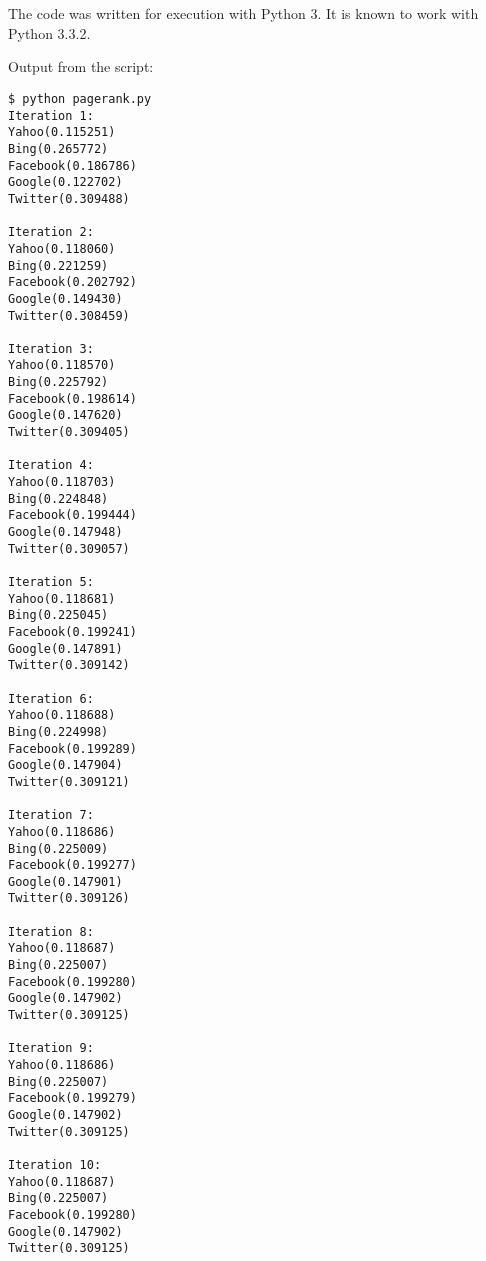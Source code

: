 
\section{} \label{appendix:3}

The code was written for execution with Python 3. It is known to work with
Python 3.3.2.



Output from the script:

\begin{lstlisting}
$ python pagerank.py
Iteration 1:
Yahoo(0.115251)
Bing(0.265772)
Facebook(0.186786)
Google(0.122702)
Twitter(0.309488)

Iteration 2:
Yahoo(0.118060)
Bing(0.221259)
Facebook(0.202792)
Google(0.149430)
Twitter(0.308459)

Iteration 3:
Yahoo(0.118570)
Bing(0.225792)
Facebook(0.198614)
Google(0.147620)
Twitter(0.309405)

Iteration 4:
Yahoo(0.118703)
Bing(0.224848)
Facebook(0.199444)
Google(0.147948)
Twitter(0.309057)

Iteration 5:
Yahoo(0.118681)
Bing(0.225045)
Facebook(0.199241)
Google(0.147891)
Twitter(0.309142)

Iteration 6:
Yahoo(0.118688)
Bing(0.224998)
Facebook(0.199289)
Google(0.147904)
Twitter(0.309121)

Iteration 7:
Yahoo(0.118686)
Bing(0.225009)
Facebook(0.199277)
Google(0.147901)
Twitter(0.309126)

Iteration 8:
Yahoo(0.118687)
Bing(0.225007)
Facebook(0.199280)
Google(0.147902)
Twitter(0.309125)

Iteration 9:
Yahoo(0.118686)
Bing(0.225007)
Facebook(0.199279)
Google(0.147902)
Twitter(0.309125)

Iteration 10:
Yahoo(0.118687)
Bing(0.225007)
Facebook(0.199280)
Google(0.147902)
Twitter(0.309125)
\end{lstlisting}


